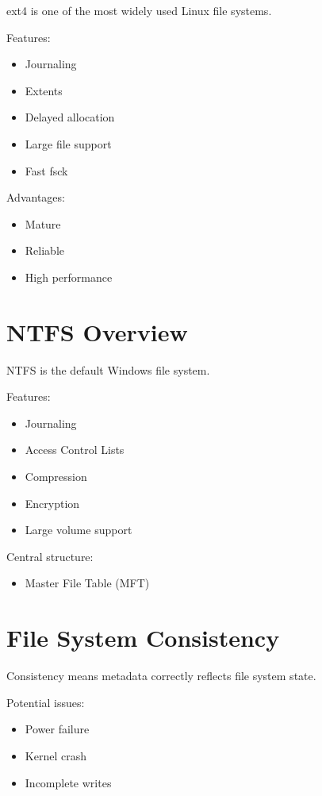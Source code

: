 ext4 is one of the most widely used Linux file systems.

Features:

\begin{itemize}
\item Journaling
\item Extents
\item Delayed allocation
\item Large file support
\item Fast fsck
\end{itemize}

Advantages:

\begin{itemize}
\item Mature
\item Reliable
\item High performance
\end{itemize}

\section{NTFS Overview}

NTFS is the default Windows file system.

Features:

\begin{itemize}
\item Journaling
\item Access Control Lists
\item Compression
\item Encryption
\item Large volume support
\end{itemize}

Central structure:

\begin{itemize}
\item Master File Table (MFT)
\end{itemize}

\section{File System Consistency}

Consistency means metadata correctly reflects file system state.

Potential issues:

\begin{itemize}
\item Power failure
\item Kernel crash
\item Incomplete writes
\end{itemize}

